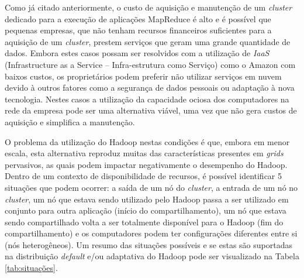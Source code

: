Como já citado anteriormente, o custo de aquisição e manutenção de um \textit{cluster} dedicado para a execução de aplicações MapReduce é alto e é possível que pequenas empresas, que não tenham recursos financeiros suficientes para a aquisição de um \textit{cluster}, prestem serviços que geram uma grande quantidade de dados. Embora estes casos possam ser resolvidos com a utilização de \textit{IaaS} (Infrastructure as a Service -- Infra-estrutura como Serviço) como o Amazon \citet{amazonEC2} com  baixos custos, os proprietários podem preferir não utilizar serviços em nuvem devido à outros fatores como a segurança de dados pessoais ou adaptação à nova tecnologia. Nestes casos a utilização da capacidade ociosa dos computadores na rede da empresa pode ser uma alternativa viável, uma vez que não gera custos de aquisição e simplifica a manutenção.

O problema da utilização do Hadoop nestas condições é que, embora em menor escala, esta alternativa reproduz muitas das características presentes em \textit{grids} pervasivos, as quais podem impactar negativamente o desempenho do Hadoop. Dentro de um contexto de disponibilidade de recursos, é possível identificar 5 situações que podem ocorrer: a saída de um nó do \textit{cluster}, a entrada de um nó no \textit{cluster}, um nó que estava sendo utilizado pelo Hadoop passa a ser utilizado em conjunto para outra aplicação (início do compartilhamento), um nó que estava sendo compartilhado volta a ser totalmente disponível para o Hadoop (fim do compartilhamento) e os computadores podem ter configurações diferentes entre si (nós heterogêneos). Um resumo das situações possíveis e se estas são suportadas na distribuição \textit{default} e/ou adaptativa do Hadoop pode ser visualizado na Tabela \ref{tab:situações}.

